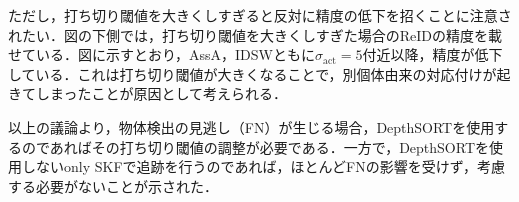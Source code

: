         ただし，打ち切り閾値を大きくしすぎると反対に精度の低下を招くことに注意されたい．図の下側では，打ち切り閾値を大きくしすぎた場合のReIDの精度を載せている．図に示すとおり，AssA，IDSWともに$\sigma_{\text{act}} = 5$付近以降，精度が低下している．これは打ち切り閾値が大きくなることで，別個体由来の対応付けが起きてしまったことが原因として考えられる．

        以上の議論より，物体検出の見逃し（FN）が生じる場合，DepthSORTを使用するのであればその打ち切り閾値の調整が必要である．一方で，DepthSORTを使用しないonly SKFで追跡を行うのであれば，ほとんどFNの影響を受けず，考慮する必要がないことが示された．

